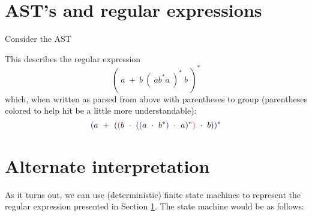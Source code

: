 \documentclass[12pt, leqno]{article} %
\begin{document}
\section{AST's and regular expressions}
\label{sec:ast_s_and_regular_expressions}
Consider the AST
\begin{center}
\end{center}
This describes the regular expression
\[
  (~a~+~b~(~ab^\ast a~)^\ast~b~)^\ast
\]
which, when written as parsed from above with parentheses to group (parentheses colored to help hit be a little more understandable):
\[
  \textcolor{blue}{(}a~+~(\textcolor{red}{(}b~\cdot~(\textcolor{blue}{(}a~\cdot~b^\ast\textcolor{blue}{)}~\cdot~a)^\ast\textcolor{red}{)}~\cdot~b)\textcolor{blue}{)}^\ast
\]
%
%
\section{Alternate interpretation}
\label{sec:alternate_interpretation_of_regular_expressions}
As it turns out, we can use (deterministic) finite state machines to represent the regular expression presented in Section \ref{sec:ast_s_and_regular_expressions}.  The state machine would be as follows:
\end{document}

